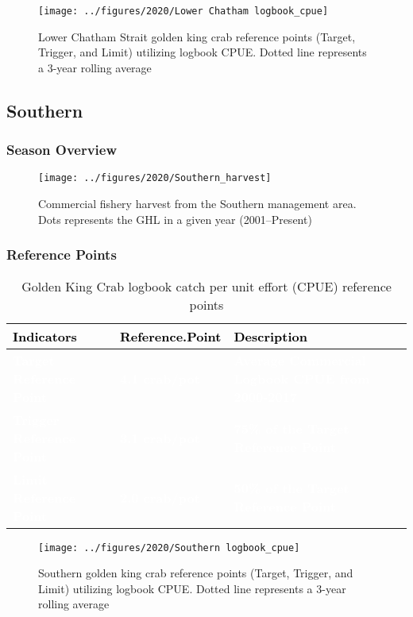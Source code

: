 \documentclass[]{article}
\begin{document}
\begin{figure}[H]
\texttt{[image: ../figures/2020/Lower Chatham logbook\_cpue]} \caption{Lower Chatham Strait golden king crab reference points (Target, Trigger, and Limit) utilizing logbook CPUE. Dotted line represents a 3-year rolling average}\label{fig:unnamed-chunk-19}
\end{figure}

\subsection{Southern}\label{southern}

\subsubsection{Season Overview}\label{season-overview-6}

\begin{figure}[H]
\texttt{[image: ../figures/2020/Southern\_harvest]} \caption{Commercial fishery harvest from the Southern management area. Dots represents the GHL in a given year (2001–Present)}\label{fig:unnamed-chunk-20}
\end{figure}

\subsubsection{Reference Points}\label{reference-points-7}

\begin{table}[!h]

\caption{\label{tab:unnamed-chunk-21}Golden King Crab logbook catch per unit effort (CPUE) reference points}
\centering
\begin{tabular}[t]{l|l|l}
\hline
\textcolor{black}{\textbf{Indicators}} & \textcolor{black}{\textbf{Reference.Point}} & \textcolor{black}{\textbf{Description}}\\
\hline
\rowcolor{gray!6}  \rowcolor{olive}  \textcolor{white}{\textbf{Target Reference Point}} & \textcolor{white}{\textbf{4.1 crab/pot}} & \textcolor{white}{\textbf{Average Commercial Logbook CPUE from 2000-2017}}\\
\hline
\rowcolor{orange}  \textcolor{white}{\textbf{Trigger Reference Point}} & \textcolor{white}{\textbf{3.1 crab/pot}} & \textcolor{white}{\textbf{75\% of the Target Reference Point}}\\
\hline
\rowcolor{gray!6}  \rowcolor{red}  \textcolor{white}{\textbf{Limit Reference Point}} & \textcolor{white}{\textbf{2.0 crab/pot}} & \textcolor{white}{\textbf{50\% of the Target Reference Point}}\\
\hline
\end{tabular}
\end{table}

\begin{figure}[H]
\texttt{[image: ../figures/2020/Southern logbook\_cpue]} \caption{Southern golden king crab reference points (Target, Trigger, and Limit) utilizing logbook CPUE. Dotted line represents a 3-year rolling average}\label{fig:unnamed-chunk-22}
\end{figure}
\end{document}
